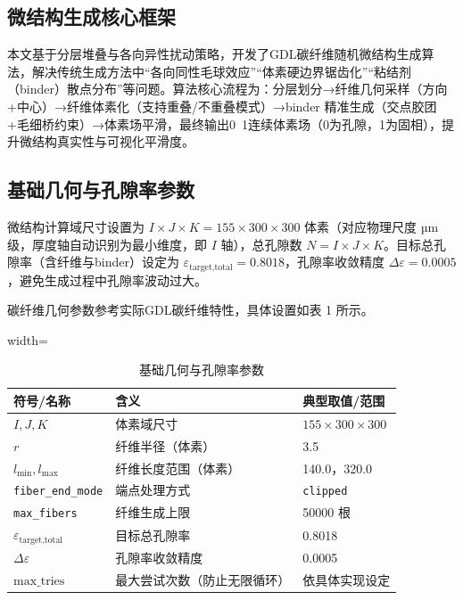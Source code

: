 \subsection{微结构生成核心框架}
本文基于分层堆叠与各向异性扰动策略，开发了GDL碳纤维随机微结构生成算法，解决传统生成方法中“各向同性毛球效应”“体素硬边界锯齿化”“粘结剂（binder）散点分布”等问题。算法核心流程为：分层划分→纤维几何采样（方向+中心）→纤维体素化（支持重叠/不重叠模式）→binder 精准生成（交点胶团+毛细桥约束）→体素场平滑，最终输出0~1连续体素场（0为孔隙，1为固相），提升微结构真实性与可视化平滑度。

\subsection{基础几何与孔隙率参数}
微结构计算域尺寸设置为 \(I \times J \times K = 155 \times 300 \times 300\) 体素（对应物理尺度 µm 级，厚度轴自动识别为最小维度，即 \(I\) 轴），总孔隙数 \(N=I \times J \times K\)。目标总孔隙率（含纤维与binder）设定为 \(\varepsilon_{\text{target,total}} = 0.8018\)，孔隙率收敛精度 \(\Delta\varepsilon = 0.0005\)，避免生成过程中孔隙率波动过大。

碳纤维几何参数参考实际GDL碳纤维特性，具体设置如表 1 所示。

\begin{table}[H]
\centering
\begingroup
\small
\setlength{\tabcolsep}{6pt}
\renewcommand{\arraystretch}{1.15}
\begin{adjustbox}{width=\columnwidth}
\begin{tabular}{p{2.2cm}p{3.0cm}p{3.2cm}}
\toprule
\textbf{符号/名称} & \textbf{含义} & \textbf{典型取值/范围} \\
\midrule
\(I,J,K\) & 体素域尺寸 & \(155 \times 300 \times 300\) \\
\(r\) & 纤维半径（体素） & 3.5 \\
\(l_{\text{min}}, l_{\text{max}}\) & 纤维长度范围（体素） & 140.0，320.0 \\
\texttt{fiber\_end\_mode} & 端点处理方式 & \texttt{clipped} \\
\texttt{max\_fibers} & 纤维生成上限 & 50000 根 \\
\(\varepsilon_{\text{target,total}}\) & 目标总孔隙率 & 0.8018 \\
\(\Delta\varepsilon\) & 孔隙率收敛精度 & 0.0005 \\
$\text{max\_tries}$ & 最大尝试次数（防止无限循环） & 依具体实现设定\\
\bottomrule
\end{tabular}
\end{adjustbox}
\endgroup
\caption{基础几何与孔隙率参数}
\label{tab:basic_params}
\end{table}

